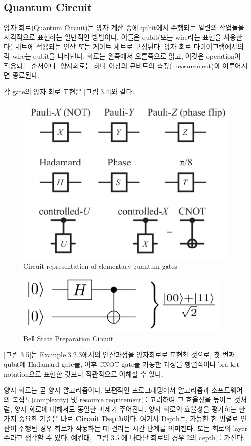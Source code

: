 \subsection{Quantum Circuit} %
양자 회로(Quantum Circuit)는 양자 계산 중에 qubit에서 수행되는 일련의 작업들을 시각적으로 표현하는 일반적인 방법이다. 이들은 qubit(또는 wire라는 표현을 사용한다) 세트에 적용되는 연산 또는 게이트 세트로 구성된다. 양자 회로 다이어그램에서의 각 wire는 qubit을 나타낸다. 회로는 왼쪽에서 오른쪽으로 읽고, 이것은 operation이 적용되는 순서이다. 양자회로는 하나 이상의 큐비트의 측정(measurement)이 이루어지면 종료된다.

각 gate의 양자 회로 표현은 [그림 3.4]와 같다.
\begin{figure}[htb!]
    \centering
    \includegraphics[width=0.45\linewidth]{figs/QuantumGateSymbols.png}
    \caption{Circuit representation of elementary quantum gates}
    \label{fig:quantum gate symbols}
\end{figure}

\begin{figure}[htb!]
    \centering
    \includegraphics[width=0.5\linewidth]{figs/BellStateCircuit.png}
    \caption{Bell State Preparation Circuit}
    \label{fig:bell state circuit}
\end{figure}

[그림 3.5]는 Example 3.2.3에서의 연산과정을 양자회로로 표현한 것으로, 첫 번째 qubit에 Hadamard gate를, 이후 CNOT gate를 가동한 과정을 행렬식이나 bra-ket notation으로 표현한 것보다 직관적으로 이해할 수 있다.

양자 회로는 곧 양자 알고리즘이다. 보편적인 프로그래밍에서 알고리즘과 소프트웨어의 복잡도(complexity) 및 resource requirement를 고려하여 그 효율성을 높이는 것처럼, 양자 회로에 대해서도 동일한 과제가 주어진다. 양자 회로의 효율성을 평가하는 한 가지 중요한 기준은 바로 \textbf{Circuit Depth}이다. 여기서 Depth는, 가능한 한 병렬로 연산이 수행될 경우 회로가 작동하는 데 걸리는 시간 단계를 의미한다. 또는 회로의 layer 수라고 생각할 수 있다. 예컨대, [그림 3.5]에 나타난 회로의 경우 2의 depth를 가진다.

